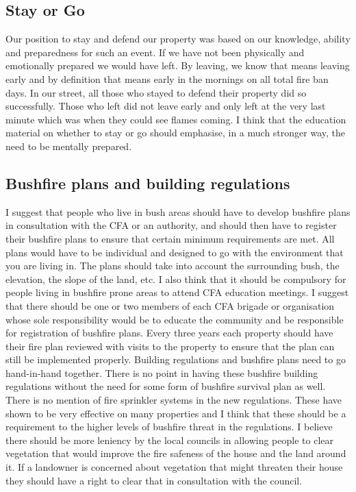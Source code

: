 \documentclass[a4paper]{article}
\begin{document}
    \subsection{Stay or Go}

        Our position to stay and defend our property was based on our knowledge, ability and preparedness for such an event. If we have not been physically and emotionally prepared we would have left. By leaving, we know that means leaving early and by definition that means early in the mornings on all total fire ban days.
        In our street, all those who stayed to defend their property did so successfully. Those who left did not leave early and only left at the very last minute which was when they could see flames coming.
        I think that the education material on whether to stay or go should emphasise, in a much stronger way, the need to be mentally prepared.

    \subsection{Bushfire plans and building regulations}

        I suggest that people who live in bush areas should have to develop bushfire plans in consultation with the CFA or an authority, and should then have to register their bushfire plans to ensure that certain minimum requirements are met.
        All plans would have to be individual and designed to go with the environment that you are living in. The plans should take into account the surrounding bush, the elevation, the slope of the land, etc.
        I also think that it should be compulsory for people living in bushfire prone areas to attend CFA education meetings.
        I suggest that there should be one or two members of each CFA brigade or organisation whose sole responsibility would be to educate the community and be responsible for registration of bushfire plans. Every three years each property should have their fire plan reviewed with visits to the property to ensure that the plan can still be implemented properly.
        Building regulations and bushfire plans need to go hand-in-hand together. There is no point in having these bushfire building regulations without the need for some form of bushfire survival plan as well.
        There is no mention of fire sprinkler systems in the new regulations. These have shown to be very effective on many properties and I think that these should be a requirement to the higher levels of bushfire threat in the regulations.
        I believe there should be more leniency by the local councils in allowing people to clear vegetation that would improve the fire safeness of the house and the land around it. If a landowner is concerned about vegetation that might threaten their house they should have a right to clear that in consultation with the council.
\end{document}
